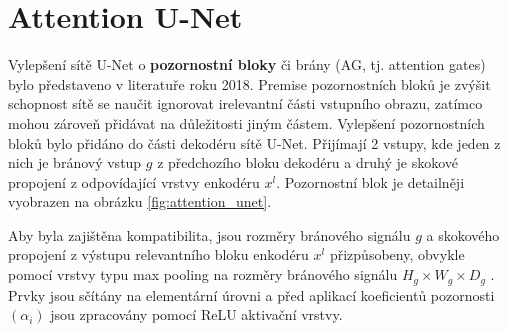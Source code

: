 \section{Attention U-Net}
\label{sec:Chapter24}

Vylepšení sítě U-Net o \textbf{pozornostní bloky} či brány (AG, tj. attention gates) bylo představeno v literatuře \cite{attentionunet} roku 2018. Premise pozornostních bloků je zvýšit schopnost sítě se naučit ignorovat irelevantní části vstupního obrazu, zatímco mohou zároveň přidávat na důležitosti jiným částem. Vylepšení pozornostních bloků bylo přidáno do části dekodéru sítě U-Net. Přijímají 2 vstupy, kde jeden z nich je bránový vstup $g$ z předchozího bloku dekodéru a druhý je skokové propojení z odpovídající vrstvy enkodéru $x^l$. Pozornostní blok je detailněji vyobrazen na obrázku \ref{fig:attention_unet}.

Aby byla zajištěna kompatibilita, jsou rozměry bránového signálu $g$ a skokového propojení z výstupu relevantního bloku enkodéru $x^l$ přizpůsobeny, obvykle pomocí vrstvy typu max pooling na rozměry bránového signálu $H_g \times W_g \times D_g$ . Prvky jsou sčítány na elementární úrovni a před aplikací koeficientů pozornosti $(\alpha_i)$ jsou zpracovány pomocí ReLU aktivační vrstvy.

